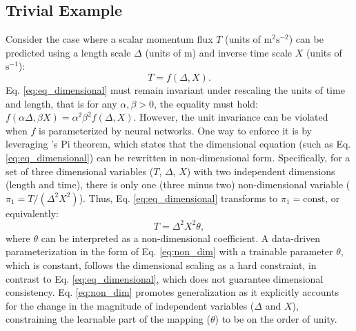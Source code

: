 \documentclass[draft]{agujournal2019}
\begin{document}

\subsection{Trivial Example}

Consider the case where a scalar momentum flux $T$ (units of $\mathrm{m}^2 \mathrm{s}^{-2}$) can be predicted using a length scale $\Delta$ (units of $\mathrm{m}$) and inverse  time scale $X$ (units of $\mathrm{s}^{-1}$):
\begin{equation}
    T = f(\Delta, X). \label{eq:eq_dimensional}
\end{equation}
Eq. \eqref{eq:eq_dimensional} must remain invariant under rescaling the units of time and length, that is for any $\alpha, \beta>0$, the equality must hold: $f( \alpha \Delta, \beta X) = \alpha^2 \beta^2 f(\Delta, X)$. However, the unit invariance can be violated when $f$ is parameterized by neural networks. One way to enforce it is by leveraging 's Pi theorem, which states that the dimensional equation  (such as Eq. \eqref{eq:eq_dimensional}) can be rewritten in non-dimensional form. Specifically, for a set of three dimensional variables ($T$, $\Delta$, $X$) with two independent dimensions (length and time), there is only one (three minus two) non-dimensional variable ($\pi_1=T/ (\Delta^2 X^2)$). Thus, Eq. \eqref{eq:eq_dimensional} transforms to  $\pi_1=\mathrm{const}$, or equivalently: \begin{equation}
    T = \Delta^2 X^2 \theta, \label{eq:non_dim}
\end{equation}
where $\theta$ can be interpreted as a non-dimensional  coefficient. A data-driven parameterization in the form of Eq. \eqref{eq:non_dim} with a trainable parameter $\theta$, which is constant, follows the dimensional scaling as a hard constraint, in contrast to Eq. \eqref{eq:eq_dimensional}, which does not guarantee dimensional consistency. Eq. \eqref{eq:non_dim} promotes generalization as it explicitly accounts for the change in the magnitude of independent variables ($\Delta$ and $X$), constraining the learnable part of the mapping ($\theta$) to be on the order of unity. %
\end{document}
